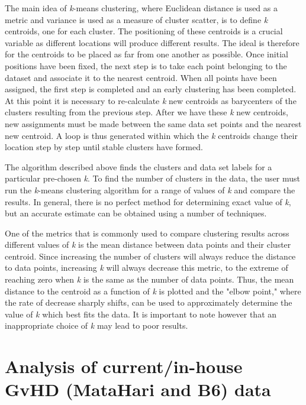 
The main idea of \textit{k}-means clustering, where Euclidean distance is used as a metric and variance is used as a measure of cluster scatter, is to define \textit{k} centroids, one for each cluster. The positioning of these centroids is a crucial variable as different locations will produce different results. The ideal is therefore for the centroids to be placed as far from one another as possible. Once initial positions have been fixed, the next step is to take each point belonging to the dataset and associate it to the nearest centroid. When all points have been assigned, the first step is completed and an early clustering has been completed. At this point it is necessary to re-calculate \textit{k} new centroids as barycenters of the clusters resulting from the previous step. After we have these \textit{k} new centroids, new assignments must be made between the same data set points and the nearest new centroid. A loop is thus generated within which the \textit{k} centroids change their location step by step until stable clusters have formed. 


The algorithm described above finds the clusters and data set labels for a particular pre-chosen \textit{k}. To find the number of clusters in the data, the user must run the \textit{k}-means clustering algorithm for a range of values of \textit{k }and compare the results. In general, there is no perfect method for determining exact value of \textit{k}, but an accurate estimate can be obtained using a number of techniques.

One of the metrics that is commonly used to compare clustering results across different values of \textit{k} is the mean distance between data points and their cluster centroid. Since increasing the number of clusters will always reduce the distance to data points, increasing \textit{k} will always decrease this metric, to the extreme of reaching zero when \textit{k} is the same as the number of data points. Thus, the mean distance to the centroid as a function of \textit{k} is plotted and the "elbow point," where the rate of decrease sharply shifts, can be used to approximately determine the value of \textit{k} which best fits the data. It is important to note however that an inappropriate choice of \textit{k} may lead to poor results. 

\newpage

\section{Analysis of current/in-house GvHD (MataHari and B6) data}

